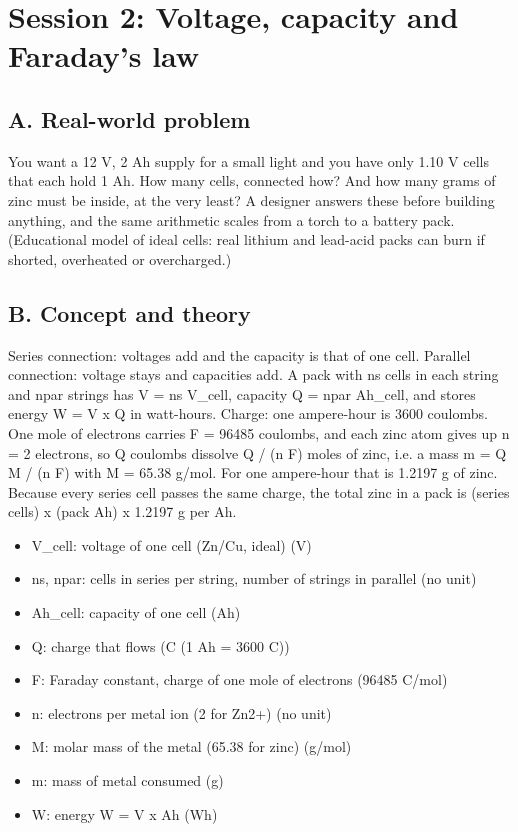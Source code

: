 \documentclass[11pt,a4paper]{article}
\begin{document}
\section{Session 2: Voltage, capacity and Faraday's law}

\subsection*{A. Real-world problem}
You want a 12 V, 2 Ah supply for a small light and you have only 1.10 V cells that each hold 1 Ah. How many cells, connected how? And how many grams of zinc must be inside, at the very least? A designer answers these before building anything, and the same arithmetic scales from a torch to a battery pack. (Educational model of ideal cells: real lithium and lead-acid packs can burn if shorted, overheated or overcharged.)

\subsection*{B. Concept and theory}
Series connection: voltages add and the capacity is that of one cell. Parallel connection: voltage stays and capacities add. A pack with ns cells in each string and npar strings has V = ns V\_cell, capacity Q = npar Ah\_cell, and stores energy W = V x Q in watt-hours. Charge: one ampere-hour is 3600 coulombs. One mole of electrons carries F = 96485 coulombs, and each zinc atom gives up n = 2 electrons, so Q coulombs dissolve Q / (n F) moles of zinc, i.e. a mass m = Q M / (n F) with M = 65.38 g/mol. For one ampere-hour that is 1.2197 g of zinc. Because every series cell passes the same charge, the total zinc in a pack is (series cells) x (pack Ah) x 1.2197 g per Ah.

\begin{itemize}[nosep]
\item V\_cell: voltage of one cell (Zn/Cu, ideal) (V)
\item ns, npar: cells in series per string, number of strings in parallel (no unit)
\item Ah\_cell: capacity of one cell (Ah)
\item Q: charge that flows (C (1 Ah = 3600 C))
\item F: Faraday constant, charge of one mole of electrons (96485 C/mol)
\item n: electrons per metal ion (2 for Zn2+) (no unit)
\item M: molar mass of the metal (65.38 for zinc) (g/mol)
\item m: mass of metal consumed (g)
\item W: energy W = V x Ah (Wh)
\end{itemize}
\end{document}
